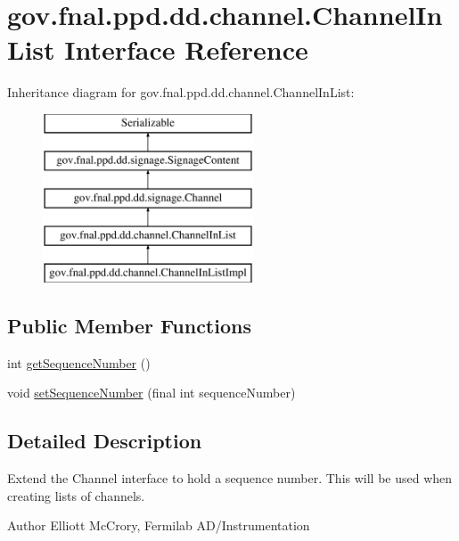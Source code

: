 \hypertarget{interfacegov_1_1fnal_1_1ppd_1_1dd_1_1channel_1_1ChannelInList}{\section{gov.\-fnal.\-ppd.\-dd.\-channel.\-Channel\-In\-List Interface Reference}
\label{interfacegov_1_1fnal_1_1ppd_1_1dd_1_1channel_1_1ChannelInList}
}
Inheritance diagram for gov.\-fnal.\-ppd.\-dd.\-channel.\-Channel\-In\-List\-:\begin{figure}[H]
\begin{center}
\leavevmode
\includegraphics[height=5.000000cm]{interfacegov_1_1fnal_1_1ppd_1_1dd_1_1channel_1_1ChannelInList}
\end{center}
\end{figure}
\subsection*{Public Member Functions}
\begin{DoxyCompactItemize}
\item 
int \hyperlink{interfacegov_1_1fnal_1_1ppd_1_1dd_1_1channel_1_1ChannelInList_a73b9620309ba3f2e8cd7142e9f107227}{get\-Sequence\-Number} ()
\item 
void \hyperlink{interfacegov_1_1fnal_1_1ppd_1_1dd_1_1channel_1_1ChannelInList_a248382f22bfd71369082af07784e0fff}{set\-Sequence\-Number} (final int sequence\-Number)
\end{DoxyCompactItemize}


\subsection{Detailed Description}
Extend the Channel interface to hold a sequence number. This will be used when creating lists of channels.

\begin{DoxyAuthor}{Author}
Elliott Mc\-Crory, Fermilab A\-D/\-Instrumentation 
\end{DoxyAuthor}


